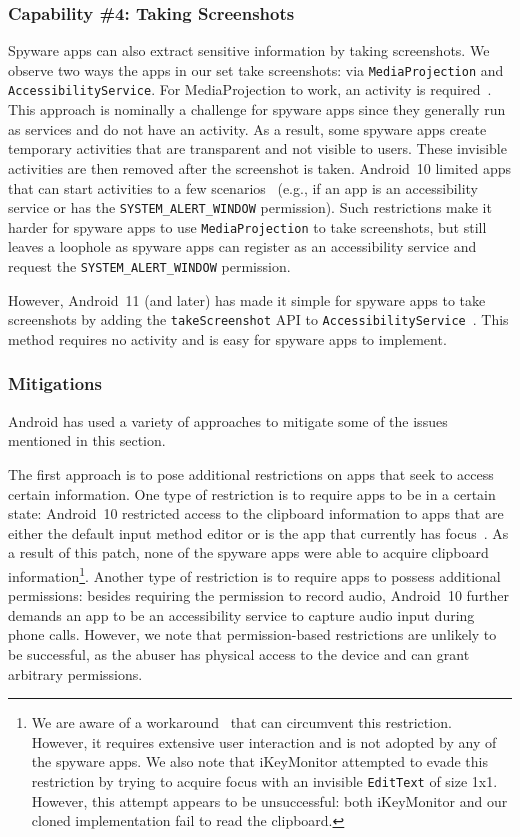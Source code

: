 \documentclass[sigconf,balance=false]{acmart}
\newcommand{\alex}[1]{\textcolor{chicagomaroon}{\noindent[AL: #1]}}
\newcommand{\damon}[1]{\textcolor{blue}{\noindent[DM: #1]}}
\newcommand{\alex}[1]{}
\newcommand{\damon}[1]{}
\begin{document}
\subsubsection*{Capability \#4: Taking Screenshots}
\label{subsubsec:screenshot}
Spyware apps can also extract sensitive information by taking screenshots. We
observe two ways the apps in our set take screenshots: via
\texttt{MediaProjection} and \texttt{AccessibilityService}. For MediaProjection
to work, an activity is required~\cite{androidH20:online}. This approach is
nominally a challenge for spyware apps since they generally run as services and
do not have an activity. As a result, some spyware apps create temporary
activities that are transparent and not visible to users. These invisible
activities are then removed after the screenshot is taken.  Android~10 limited
apps that can start activities to a few scenarios~\cite{Restrict50:online}
(e.g., if an app is an accessibility service or has the \texttt{SYSTEM\_ALERT\_WINDOW}
permission). Such restrictions make it harder for spyware apps to use
\texttt{MediaProjection} to take screenshots, but still leaves a loophole as spyware apps
can register as an accessibility service and request the \texttt{SYSTEM\_ALERT\_WINDOW}
permission.

However, Android~11 (and later) has made it
simple for spyware apps to take screenshots by adding the
\texttt{takeScreenshot} API to \texttt{AccessibilityService}~\cite{Accessib97:online}.
This method requires no activity and is easy for spyware apps to implement.


\subsubsection{Mitigations}
Android has used a variety of approaches to mitigate some of the issues mentioned in this section.

The first approach is to pose additional restrictions on apps that seek to access certain information. One type of restriction is to require apps to be in a certain state: Android~10 restricted access to the clipboard information
to apps that are either the default input
method editor or is the app that currently has focus~\cite{Privacyc52:online}. As a result of this
patch, none of the spyware apps were able to acquire clipboard information\footnote{We are aware of a workaround~\cite{SolvedCl34:online} that can circumvent this restriction. However, it requires extensive user interaction and is not adopted by any of the spyware apps. We also note
that iKeyMonitor
attempted to evade this restriction by trying to acquire focus with an
invisible \texttt{EditText} of size 1x1. However, this attempt appears to be
unsuccessful: both iKeyMonitor and our cloned implementation fail to
read the clipboard.}. Another type of restriction is to require apps to possess additional permissions: besides requiring the permission to record audio, Android~10 further demands an app to be an accessibility service to capture audio input during phone calls. However, we note that permission-based restrictions are unlikely to be successful, as the abuser has physical access to the device and can grant arbitrary permissions.
\end{document}
